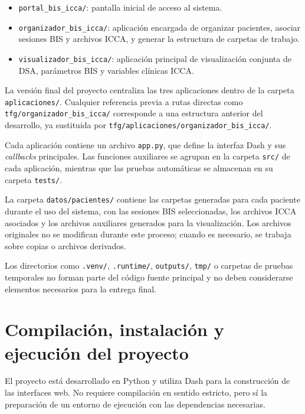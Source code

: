 \documentclass[
  spanish,
  a4paper,
  12pt,
  twoside]{memoir}
\providecommand{\tightlist}{%
  \setlength{\itemsep}{0pt}\setlength{\parskip}{0pt}}
\begin{document}
\begin{itemize}
\tightlist
\item
  \texttt{portal\_bis\_icca/}: pantalla inicial de acceso al sistema.
\item
  \texttt{organizador\_bis\_icca/}: aplicación encargada de organizar
  pacientes, asociar sesiones BIS y archivos ICCA, y generar la
  estructura de carpetas de trabajo.
\item
  \texttt{visualizador\_bis\_icca/}: aplicación principal de
  visualización conjunta de DSA, parámetros BIS y variables clínicas
  ICCA.
\end{itemize}

La versión final del proyecto centraliza las tres aplicaciones dentro de
la carpeta \texttt{aplicaciones/}. Cualquier referencia previa a rutas
directas como \texttt{tfg/organizador\_bis\_icca/} corresponde a una
estructura anterior del desarrollo, ya sustituida por
\texttt{tfg/aplicaciones/organizador\_bis\_icca/}.

Cada aplicación contiene un archivo \texttt{app.py}, que define la
interfaz Dash y sus \emph{callbacks} principales. Las funciones
auxiliares se agrupan en la carpeta \texttt{src/} de cada aplicación,
mientras que las pruebas automáticas se almacenan en su carpeta
\texttt{tests/}.

La carpeta \texttt{datos/pacientes/} contiene las carpetas generadas
para cada paciente durante el uso del sistema, con las sesiones BIS
seleccionadas, los archivos ICCA asociados y los archivos auxiliares
generados para la visualización. Los archivos originales no se modifican
durante este proceso; cuando es necesario, se trabaja sobre copias o
archivos derivados.

Los directorios como \texttt{.venv/}, \texttt{.runtime/},
\texttt{outputs/}, \texttt{tmp/} o carpetas de pruebas temporales no
forman parte del código fuente principal y no deben considerarse
elementos necesarios para la entrega final.

\chapter{Compilación, instalación y ejecución del
proyecto}\label{compilaciuxf3n-instalaciuxf3n-y-ejecuciuxf3n-del-proyecto}

El proyecto está desarrollado en Python y utiliza Dash para la
construcción de las interfaces web. No requiere compilación en sentido
estricto, pero sí la preparación de un entorno de ejecución con las
dependencias necesarias.
\end{document}
